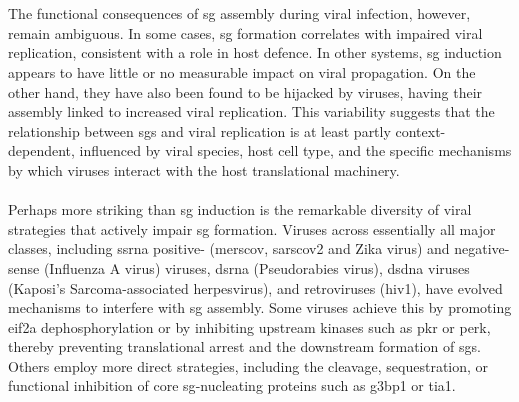 \\
\\
The functional consequences of \gls{sg} assembly during viral infection, however, remain ambiguous. In some cases, \gls{sg} formation correlates with impaired viral replication, consistent with a role in host defence\cite{albornoz_stress_2014}. In other systems, \gls{sg} induction appears to have little or no measurable impact on viral propagation\cite{lindquist_activation_2011}. On the other hand, they have also been found to be hijacked by viruses, having their assembly linked to increased viral replication\cite{sun_newcastle_2017}.
This variability suggests that the relationship between \glspl{sg} and viral replication is at least partly context-dependent, influenced by viral species, host cell type, and the specific mechanisms by which viruses interact with the host translational machinery.
\\
\\
Perhaps more striking than \gls{sg} induction is the remarkable diversity of viral strategies that actively impair \gls{sg} formation\cite{guan_multiple_2023}. Viruses across essentially all major classes, including \gls{ssrna} positive- (\gls{merscov}\cite{nakagawa_inhibition_2018}, \gls{sarscov2}\cite{nabeel-shah_sars-cov-2_2022} and Zika virus\cite{bonenfant_zika_2019}) and negative-sense (Influenza A virus\cite{khaperskyy_influenza_2014}) viruses, \gls{dsrna} (Pseudorabies virus\cite{xu_pseudorabies_2020}), \gls{dsdna} viruses (Kaposi's Sarcoma-associated herpesvirus\cite{sharma_kshv_2017}), and retroviruses (\gls{hiv1}\cite{abrahamyan_novel_2010}), have evolved mechanisms to interfere with \gls{sg} assembly. Some viruses achieve this by promoting \gls{eif2a} dephosphorylation\cite{xu_pseudorabies_2020} or by inhibiting upstream kinases such as \gls{pkr} or \gls{perk}\cite{nakagawa_inhibition_2018, khaperskyy_influenza_2014, sharma_kshv_2017}, thereby preventing translational arrest and the downstream formation of \glspl{sg}. Others employ more direct strategies, including the cleavage, sequestration, or functional inhibition of core \gls{sg}-nucleating proteins such as \gls{g3bp1}\cite{nabeel-shah_sars-cov-2_2022, bonenfant_zika_2019} or \gls{tia1}\cite{emara_interaction_2007}.
\\
\\
